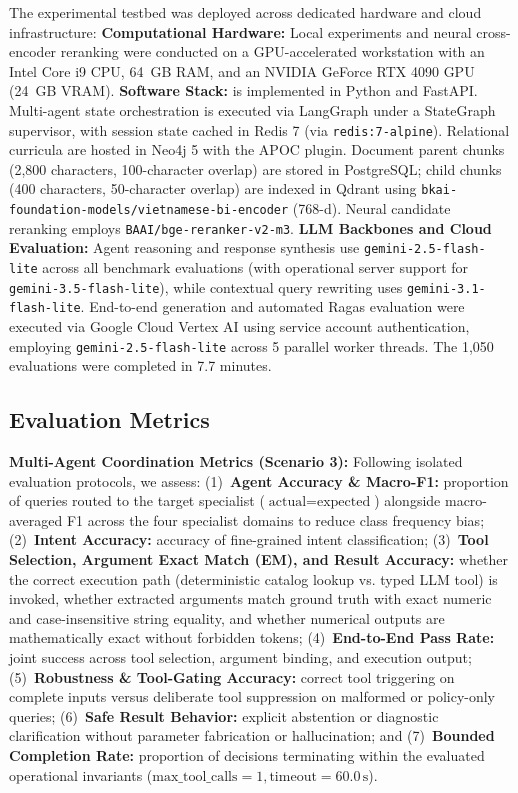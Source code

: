 The experimental testbed was deployed across dedicated hardware and cloud infrastructure:
\textbf{Computational Hardware:} Local experiments and neural cross-encoder reranking were conducted on a GPU-accelerated workstation with an Intel Core i9 CPU, 64~GB RAM, and an NVIDIA GeForce RTX 4090 GPU (24~GB VRAM).
\textbf{Software Stack:} \system{} is implemented in Python and FastAPI. Multi-agent state orchestration is executed via LangGraph under a StateGraph supervisor, with session state cached in Redis 7 (via \texttt{redis:7-alpine}). Relational curricula are hosted in Neo4j 5 with the APOC plugin. Document parent chunks (2,800 characters, 100-character overlap) are stored in PostgreSQL; child chunks (400 characters, 50-character overlap) are indexed in Qdrant using \texttt{bkai-foundation-models/vietnamese-bi-encoder} (768-d). Neural candidate reranking employs \texttt{BAAI/bge-reranker-v2-m3}.
\textbf{LLM Backbones and Cloud Evaluation:} Agent reasoning and response synthesis use \texttt{gemini-2.5-flash-lite} across all benchmark evaluations (with operational server support for \texttt{gemini-3.5-flash-lite}), while contextual query rewriting uses \texttt{gemini-3.1-flash-lite}. End-to-end generation and automated Ragas evaluation were executed via Google Cloud Vertex AI using service account authentication, employing \texttt{gemini-2.5-flash-lite} across 5 parallel worker threads. The 1,050 evaluations were completed in 7.7 minutes.

\subsection{Evaluation Metrics}
\label{sec:metrics}

\textbf{Multi-Agent Coordination Metrics (Scenario 3):} Following isolated evaluation protocols, we assess: (1)~\textbf{Agent Accuracy \& Macro-F1:} proportion of queries routed to the target specialist ($\text{actual}=\text{expected}$) alongside macro-averaged F1 across the four specialist domains to reduce class frequency bias; (2)~\textbf{Intent Accuracy:} accuracy of fine-grained intent classification; (3)~\textbf{Tool Selection, Argument Exact Match (EM), and Result Accuracy:} whether the correct execution path (deterministic catalog lookup vs. typed LLM tool) is invoked, whether extracted arguments match ground truth with exact numeric and case-insensitive string equality, and whether numerical outputs are mathematically exact without forbidden tokens; (4)~\textbf{End-to-End Pass Rate:} joint success across tool selection, argument binding, and execution output; (5)~\textbf{Robustness \& Tool-Gating Accuracy:} correct tool triggering on complete inputs versus deliberate tool suppression on malformed or policy-only queries; (6)~\textbf{Safe Result Behavior:} explicit abstention or diagnostic clarification without parameter fabrication or hallucination; and (7)~\textbf{Bounded Completion Rate:} proportion of decisions terminating within the evaluated operational invariants ($\text{max\_tool\_calls}=1, \text{timeout}=60.0\,\text{s}$).

